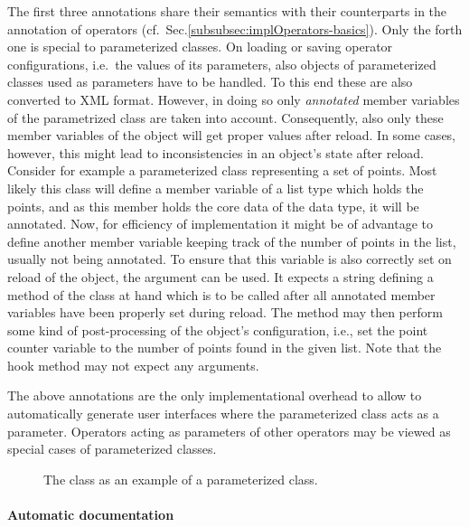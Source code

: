 The first three annotations share their semantics with their counterparts in the
 annotation of operators
(cf.~Sec.\ref{subsubsec:implOperators-basics}).
Only the forth one is special to parameterized classes. On loading or saving
operator configurations, i.e.~the values of its parameters, also objects of
parameterized classes used as parameters have to be handled. To this end these
are also converted to XML format. However, in doing so only {\em annotated}
member variables of the parametrized class are taken into account. Consequently,
also only these member variables of the object will get proper values after
reload.
In some cases, however, this might lead to inconsistencies in an object's state
after reload. Consider for example a parameterized class representing a set of
points. Most likely this class will define a member variable of a list type
which holds the points, and as this member holds the core data of the data
type, it will be annotated.
Now, for efficiency of implementation it might be of advantage to define another
member variable keeping track of the number of points in the list, usually not
being annotated. To ensure that this variable is also correctly set on reload of
the object, the  argument can be used. It expects a
string defining a method of the class at hand which is to be called after all
annotated member variables have been properly set during reload. The method may
then perform some kind of post-processing of the object's configuration, i.e.,
set the point counter variable to the number of points found in the given list.
Note that the hook method may not expect any arguments.

The above annotations are
the only implementational overhead to allow \alida to automatically generate user interfaces where the parameterized class acts as a parameter.
Operators acting as parameters of other operators may be viewed as
special cases of parameterized classes.


\begin{figure}

\caption{\label{exa:parametrizedClass}The class  as an example of a parameterized class.}
\end{figure}

\paragraph{Automatic documentation}

